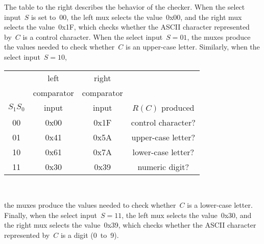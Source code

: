 \begin{minipage}{2.8in}
The table to the right describes the behavior of the checker.
%
When the select input~$S$ is set to~$00$, the left mux selects the value~0x00,
and the right mux selects the value~0x1F, which checks whether the ASCII
character represented by~$C$ is a control character.
%
When the select input~$S=01$, the muxes produce the values needed to check
whether~$C$ is an upper-case letter.
%
Similarly, when the select input~$S=10$,\linebreak
\end{minipage}\hspace{0.25in}%
\begin{minipage}{3.45in}
\begin{tabular}{c|c|c|c}
& left& right& \\
& comparator& comparator& \\
$S_1S_0$& input& input& $R(C)$ produced \\ \hline
00& 0x00& 0x1F& control character?\\
01& 0x41& 0x5A& upper-case letter?\\
10& 0x61& 0x7A& lower-case letter?\\
11& 0x30& 0x39& numeric digit?\\ 
\end{tabular}\\
\end{minipage}\mpdone

the muxes produce the values 
needed to check whether~$C$ is a lower-case letter.
%
Finally, when the select input~$S=11$, the left mux selects the value~0x30,
and the right mux selects the value~0x39, which checks whether the ASCII
character represented by~$C$ is a digit (0~to~9).



\pagebreak
